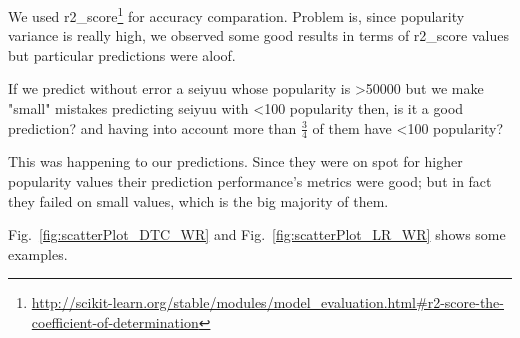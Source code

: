 We used r2\_score\footnote{\url{http://scikit-learn.org/stable/modules/model_evaluation.html#r2-score-the-coefficient-of-determination}} for accuracy comparation. Problem is, since popularity variance is really high, we observed some good results in terms of r2\_score values but particular predictions were aloof. 

If we predict without error a seiyuu whose popularity is \textgreater50000 but we make "small" mistakes predicting seiyuu with \textless100 popularity then, is it a good prediction? and having into account more than $\frac{3}{4}$ of them have \textless100 popularity? 

This was happening to our predictions. Since they were on spot for higher popularity values their prediction performance's metrics were good; but in fact they failed on small values, which is the big majority of them. 

Fig.~\ref{fig:scatterPlot_DTC_WR} and Fig.~\ref{fig:scatterPlot_LR_WR} shows some examples.\\

